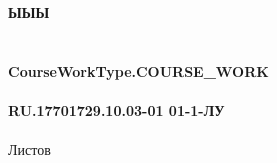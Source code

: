 \documentclass{article}
\begin{document}
\fontsize{14}{16}\selectfont
\thispagestyle{empty}
\clearpage
{}
\bigskip
\begin{center}
\topskip=0pt
\vspace*{\fill}
\textbf{ЫЫЫ~\\
~\\
~\\
CourseWorkType.COURSE\_WORK\\
~\\
RU.17701729.10.03-01 01-1-ЛУ}\\
~\\
Листов \ztotpages\\
\vspace*{\fill}
\end{center}
\begin{center}
\end{center}
\newpage
\tableofcontents
\newpage
\newpage
\end{document}
